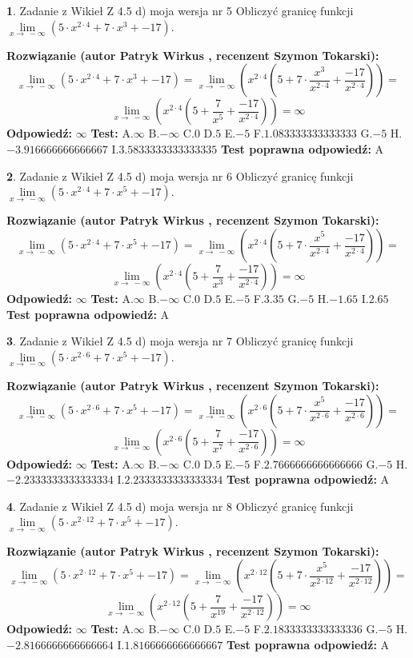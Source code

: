 \documentclass[12pt, a4paper]{article}
\theoremstyle{definition} %
\newtheorem{zad}{}
\newcommand{\zadStart}[1]{\begin{zad}#1\newline}
\newcommand{\zadStop}{\end{zad}}
\newcommand{\rozwStart}[2]{\noindent \textbf{Rozwiązanie (autor #1 , recenzent #2): }\newline}
\newcommand{\rozwStop}{\newline}
\newcommand{\odpStart}{\noindent \textbf{Odpowiedź:}\newline}
\newcommand{\odpStop}{\newline}
\newcommand{\testStart}{\noindent \textbf{Test:}\newline}
\newcommand{\testStop}{\newline}
\newcommand{\kluczStart}{\noindent \textbf{Test poprawna odpowiedź:}\newline}
\newcommand{\kluczStop}{\newline}
\begin{document}
\zadStart{Zadanie z Wikieł Z 4.5 d) moja wersja nr 5}
Obliczyć granicę funkcji  $\lim\limits_{x\to\ -\infty}(5 \cdot x^{2\cdot4}+7 \cdot x^{3}+-17)$.
\zadStop
\rozwStart{Patryk Wirkus}{Szymon Tokarski}
$$\lim\limits_{x\to\ -\infty}(5 \cdot x^{2\cdot4}+7 \cdot x^{3}+-17) = \lim\limits_{x\to\ -\infty}(x^{2\cdot4}(5 +7 \cdot \frac{x^{3}}{x^{2\cdot4}}+\frac{-17}{x^{2\cdot4}})) =$$ $$\lim\limits_{x\to\ -\infty}(x^{2\cdot4}(5 +\frac{7}{x^{5}}+\frac{-17}{x^{2\cdot4}})) =\infty$$
\rozwStop
\odpStart
$\infty$
\odpStop
\testStart
A.$\infty$ B.$-\infty$ C.$0$ D.$5$ E.$-5$
F.$1.083333333333333$ G.$-5$
H.$-3.916666666666667$
I.$3.5833333333333335$
\testStop
\kluczStart
A
\kluczStop



\zadStart{Zadanie z Wikieł Z 4.5 d) moja wersja nr 6}
Obliczyć granicę funkcji  $\lim\limits_{x\to\ -\infty}(5 \cdot x^{2\cdot4}+7 \cdot x^{5}+-17)$.
\zadStop
\rozwStart{Patryk Wirkus}{Szymon Tokarski}
$$\lim\limits_{x\to\ -\infty}(5 \cdot x^{2\cdot4}+7 \cdot x^{5}+-17) = \lim\limits_{x\to\ -\infty}(x^{2\cdot4}(5 +7 \cdot \frac{x^{5}}{x^{2\cdot4}}+\frac{-17}{x^{2\cdot4}})) =$$ $$\lim\limits_{x\to\ -\infty}(x^{2\cdot4}(5 +\frac{7}{x^{3}}+\frac{-17}{x^{2\cdot4}})) =\infty$$
\rozwStop
\odpStart
$\infty$
\odpStop
\testStart
A.$\infty$ B.$-\infty$ C.$0$ D.$5$ E.$-5$
F.$3.35$ G.$-5$
H.$-1.65$
I.$2.65$
\testStop
\kluczStart
A
\kluczStop



\zadStart{Zadanie z Wikieł Z 4.5 d) moja wersja nr 7}
Obliczyć granicę funkcji  $\lim\limits_{x\to\ -\infty}(5 \cdot x^{2\cdot6}+7 \cdot x^{5}+-17)$.
\zadStop
\rozwStart{Patryk Wirkus}{Szymon Tokarski}
$$\lim\limits_{x\to\ -\infty}(5 \cdot x^{2\cdot6}+7 \cdot x^{5}+-17) = \lim\limits_{x\to\ -\infty}(x^{2\cdot6}(5 +7 \cdot \frac{x^{5}}{x^{2\cdot6}}+\frac{-17}{x^{2\cdot6}})) =$$ $$\lim\limits_{x\to\ -\infty}(x^{2\cdot6}(5 +\frac{7}{x^{7}}+\frac{-17}{x^{2\cdot6}})) =\infty$$
\rozwStop
\odpStart
$\infty$
\odpStop
\testStart
A.$\infty$ B.$-\infty$ C.$0$ D.$5$ E.$-5$
F.$2.7666666666666666$ G.$-5$
H.$-2.2333333333333334$
I.$2.2333333333333334$
\testStop
\kluczStart
A
\kluczStop



\zadStart{Zadanie z Wikieł Z 4.5 d) moja wersja nr 8}
Obliczyć granicę funkcji  $\lim\limits_{x\to\ -\infty}(5 \cdot x^{2\cdot12}+7 \cdot x^{5}+-17)$.
\zadStop
\rozwStart{Patryk Wirkus}{Szymon Tokarski}
$$\lim\limits_{x\to\ -\infty}(5 \cdot x^{2\cdot12}+7 \cdot x^{5}+-17) = \lim\limits_{x\to\ -\infty}(x^{2\cdot12}(5 +7 \cdot \frac{x^{5}}{x^{2\cdot12}}+\frac{-17}{x^{2\cdot12}})) =$$ $$\lim\limits_{x\to\ -\infty}(x^{2\cdot12}(5 +\frac{7}{x^{19}}+\frac{-17}{x^{2\cdot12}})) =\infty$$
\rozwStop
\odpStart
$\infty$
\odpStop
\testStart
A.$\infty$ B.$-\infty$ C.$0$ D.$5$ E.$-5$
F.$2.1833333333333336$ G.$-5$
H.$-2.8166666666666664$
I.$1.8166666666666667$
\testStop
\kluczStart
A
\kluczStop
\end{document}
